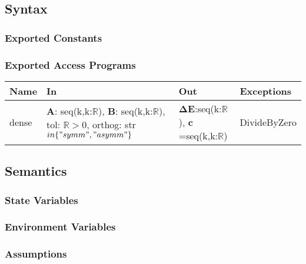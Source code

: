 \documentclass[12pt, titlepage]{article}
\begin{document}
\subsection{Syntax}

\subsubsection{Exported Constants}

\subsubsection{Exported Access Programs}

\begin{center}
	\begin{tabular}{p{2cm} p{4cm} p{4cm} p{2cm}}
		\hline
		\textbf{Name} & \textbf{In} & \textbf{Out} & \textbf{Exceptions} \\
		\hline
		dense & $\textbf{A}$: seq(k,k:$\mathbb{R}$), $\textbf{B}$: 
		seq(k,k:$\mathbb{R}$), 
		tol: $\mathbb{R} >0$, 
		orthog: str $in \{"symm", "asymm"\}$& 
		$\boldsymbol{\Delta E}$:seq(k:$\mathbb{R}$), 
		$\boldsymbol{c}$=seq(k,k:$\mathbb{R}$) & 
		DivideByZero \\
		\hline
	\end{tabular}
\end{center}

\subsection{Semantics}

\subsubsection{State Variables}


\subsubsection{Environment Variables}


\subsubsection{Assumptions}
\end{document}
